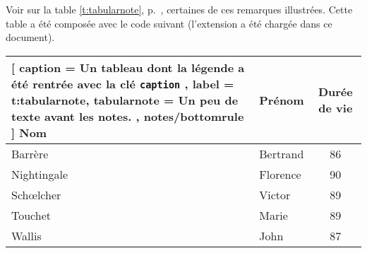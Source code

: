 \documentclass[dvipsnames]{article}%
\begin{document}
%
Voir sur la table \ref{t:tabularnote}, p.~\pageref{t:tabularnote}, certaines de ces
remarques illustrées. Cette table a été composée avec le code suivant
(l'extension  a été chargée dans ce document).

\bigskip
\begin{scope}
\small
\begin{Code}
\begin{table}[hbt]
\centering
{}
\begin{NiceTabular}{@{}llc@{}}%
  [
   caption = Un tableau dont la légende a été rentrée avec la clé \texttt{caption}%
              \emph{} ,
   label = t:tabularnote, 
   tabularnote = Un peu de texte avant les notes. ,
   notes/bottomrule
  ]
\toprule
Nom       & Prénom   & Durée de vie \\
\midrule
Barrère   & Bertrand & 86\\
Nightingale\emph{%
           } 
          & Florence\emph{} & 90 \\
Schœlcher & Victor   & 89\emph{} \\
Touchet   & Marie\emph{} & 89 \\
Wallis    & John     & 87 \\
\bottomrule
\end{NiceTabular}
\end{table}
\end{Code}%
\end{scope}
\end{document}
